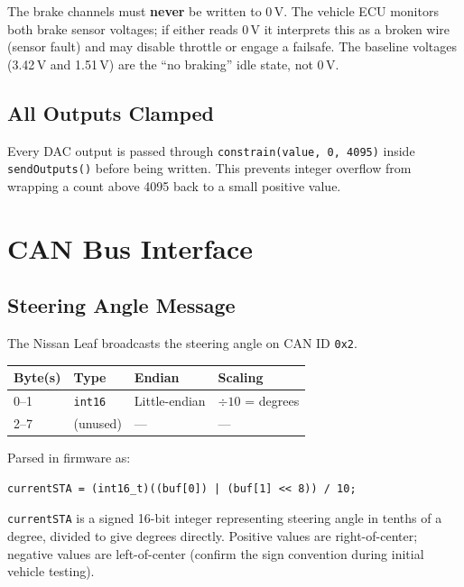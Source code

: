 \documentclass[12pt, letterpaper]{article}
\begin{document}
\begin{warningbox}
The brake channels must \textbf{never} be written to 0\,V.  The vehicle ECU
monitors both brake sensor voltages; if either reads 0\,V it interprets this as
a broken wire (sensor fault) and may disable throttle or engage a failsafe.
The baseline voltages (3.42\,V and 1.51\,V) are the ``no braking'' idle state,
not 0\,V.
\end{warningbox}

\subsection{All Outputs Clamped}

Every DAC output is passed through \texttt{constrain(value, 0, 4095)} inside
\texttt{sendOutputs()} before being written.  This prevents integer overflow
from wrapping a count above 4095 back to a small positive value.

\section{CAN Bus Interface}

\subsection{Steering Angle Message}

The Nissan Leaf broadcasts the steering angle on CAN ID \texttt{0x2}.

\begin{center}
\begin{tabular}{llll}
  \toprule
  \textbf{Byte(s)} & \textbf{Type} & \textbf{Endian} & \textbf{Scaling} \\
  \midrule
  0--1 & \texttt{int16} & Little-endian & $\div 10$ = degrees \\
  2--7 & (unused) & --- & --- \\
  \bottomrule
\end{tabular}
\end{center}

Parsed in firmware as:

\begin{lstlisting}[style=cpp]
currentSTA = (int16_t)((buf[0]) | (buf[1] << 8)) / 10;
\end{lstlisting}

\texttt{currentSTA} is a signed 16-bit integer representing steering angle in
tenths of a degree, divided to give degrees directly.  Positive values are
right-of-center; negative values are left-of-center (confirm the sign convention
during initial vehicle testing).
\end{document}

